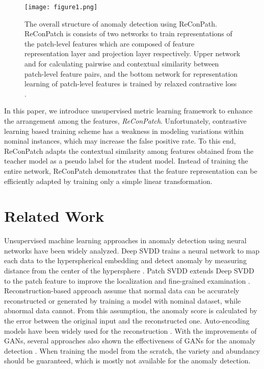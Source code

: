 \documentclass[10pt,onecolumn,letterpaper]{article}
\begin{document}
\begin{figure*}
\begin{center}
\texttt{[image: figure1.png]}
\end{center}
\caption{The overall structure of anomaly detection using ReConPath. ReConPatch is consists of two networks to train representations of the patch-level features which are composed of feature representation layer  and projection layer  respectively. Upper network  and  for calculating pairwise and contextual similarity between patch-level feature pairs, and the bottom network for representation learning of patch-level features is trained by relaxed contrastive loss .}
\label{fig:num1}
\end{figure*}
In this paper, we introduce unsupervised metric learning framework to enhance the arrangement among the features, \textit{ReConPatch}. Unfortunately, contrastive learning based training scheme has a weakness in modeling variations within nominal instances, which may increase the false positive rate. To this end, ReConPatch adapts the contextual similarity \cite{kim2022self} among features obtained from the teacher model as a pseudo label for the student model. Instead of training the entire network, ReConPatch demonstrates that the feature representation can be efficiently adapted by training only a simple linear transformation. 






\section{Related Work}
Unsupervised machine learning approaches in anomaly detection using neural networks have been widely analyzed.
Deep SVDD trains a neural network to map each data to the hyperspherical embedding and detect anomaly by measuring distance from the center of the hypersphere \cite{ruff2018deep}. 
Patch SVDD extends Deep SVDD to the patch feature to improve the localization and fine-grained examination \cite{yi2020patch}.
Reconstruction-based approach assume that normal data can be accurately reconstructed or generated by training a model with nominal dataset, while abnormal data cannot. From this assumption, the anomaly score is calculated by the error between the original input and the reconstructed one.
Auto-encoding models have been widely used for the reconstruction \cite{davletshina2020unsupervised,nguyen2019anomaly,sakurada2014anomaly}. With the improvements of GANs, several approaches also shown the effectiveness of GANs for the anomaly detection \cite{pidhorskyi2018generative,sabokrou2018adversarially}. When training the model from the scratch, the variety and abundancy should be guaranteed, which is mostly not available for the anomaly detection.
\end{document}
